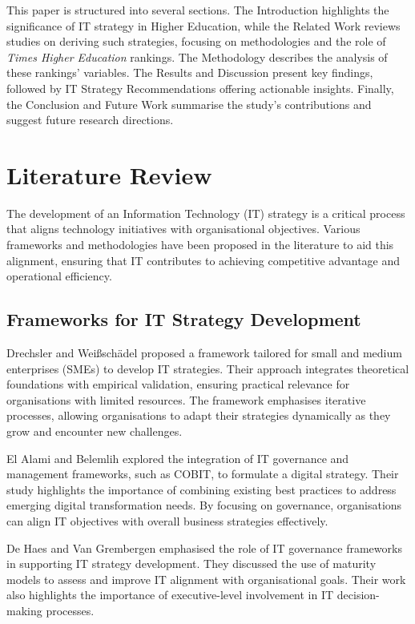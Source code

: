 \documentclass[sigconf]{acmart}
\begin{document}
This paper is structured into several sections. The Introduction highlights the significance of IT strategy in Higher Education, while the Related Work reviews studies on deriving such strategies, focusing on methodologies and the role of \textit{Times Higher Education} rankings. The Methodology describes the analysis of these rankings' variables. The Results and Discussion present key findings, followed by IT Strategy Recommendations offering actionable insights. Finally, the Conclusion and Future Work summarise the study's contributions and suggest future research directions.


\section{Literature Review}
\label{sec:literature_review}

The development of an Information Technology (IT) strategy is a critical process that aligns technology initiatives with organisational objectives. Various frameworks and methodologies have been proposed in the literature to aid this alignment, ensuring that IT contributes to achieving competitive advantage and operational efficiency.

\subsection{Frameworks for IT Strategy Development}

Drechsler and Weißschädel \cite{drechsler2018framework} proposed a framework tailored for small and medium enterprises (SMEs) to develop IT strategies. Their approach integrates theoretical foundations with empirical validation, ensuring practical relevance for organisations with limited resources. The framework emphasises iterative processes, allowing organisations to adapt their strategies dynamically as they grow and encounter new challenges.

El Alami and Belemlih \cite{elalami2021digital} explored the integration of IT governance and management frameworks, such as COBIT, to formulate a digital strategy. Their study highlights the importance of combining existing best practices to address emerging digital transformation needs. By focusing on governance, organisations can align IT objectives with overall business strategies effectively.

De Haes and Van Grembergen \cite{dehaes2009governance} emphasised the role of IT governance frameworks in supporting IT strategy development. They discussed the use of maturity models to assess and improve IT alignment with organisational goals. Their work also highlights the importance of executive-level involvement in IT decision-making processes.
\end{document}
